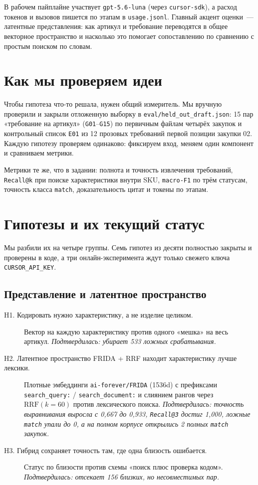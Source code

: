 \documentclass[11pt,a4paper]{article}
\begin{document}
В рабочем пайплайне участвует \texttt{gpt-5.6-luna} (через \texttt{cursor-sdk}), а расход токенов и вызовов пишется по этапам в \texttt{usage.jsonl}. Главный акцент оценки~--- латентные представления: как артикул и требование переводятся в общее векторное пространство и насколько это помогает сопоставлению по сравнению с простым поиском по словам.

\section{Как мы проверяем идеи}

Чтобы гипотеза что-то решала, нужен общий измеритель. Мы вручную проверили и закрыли отложенную выборку в \nolinkurl{eval/held_out_draft.json}: 15 пар «требование на артикул» (\texttt{G01}--\texttt{G15}) по первичным файлам четырёх закупок и контрольный список \texttt{E01} из 12 прозовых требований первой позиции закупки 02. Каждую гипотезу проверяем одинаково: фиксируем вход, меняем один компонент и сравниваем метрики.

Метрики те же, что в задании: полнота и точность извлечения требований, \texttt{Recall@k} при поиске характеристики внутри SKU, \texttt{macro-F1} по трём статусам, точность класса \texttt{match}, доказательность цитат и токены по этапам.

\section{Гипотезы и их текущий статус}

Мы разбили их на четыре группы. Семь гипотез из десяти полностью закрыты и проверены в коде, а три онлайн-эксперимента ждут только свежего ключа \texttt{CURSOR\_API\_KEY}.

\subsection*{Представление и латентное пространство}

\begin{description}
  \item[H1. Кодировать нужно характеристику, а не изделие целиком.] Вектор на каждую характеристику против одного «мешка» на весь артикул. \emph{Подтвердилась: убирает 533 ложных срабатывания.}
  \item[H2. Латентное пространство FRIDA + RRF находит характеристику лучше лексики.] Плотные эмбеддинги \texttt{ai-forever/FRIDA} (1536d) с префиксами \texttt{search\_query:} / \texttt{search\_document:} и слиянием рангов через $\mathrm{RRF}(k=60)$ против лексического поиска. \emph{Подтвердилась: точность выравнивания выросла с 0,667 до 0,933, \texttt{Recall@3} достиг 1,000, ложные \texttt{match} упали до 0, а на полном корпусе открылись 2 полных \texttt{match} закупок.}
  \item[H3. Гибрид сохраняет точность там, где одна близость ошибается.] Статус по близости против схемы «поиск плюс проверка кодом». \emph{Подтвердилась: отсекает 156 близких, но несовместимых пар.}
\end{description}
\end{document}
